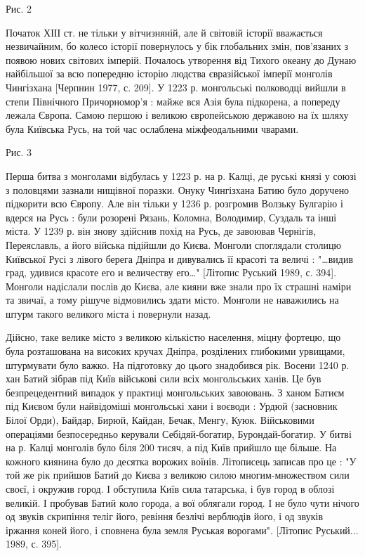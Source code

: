Рис. 2

Початок ХІІІ ст. не тільки у вітчизняній, але й світовій історії вважається
незвичайним, бо колесо історії повернулось у бік глобальних змін, пов'язаних з
появою нових світових імперій. Почалось утворення від Тихого океану до Дунаю
найбільшої за всю попередню історію людства євразійської імперії монголів
Чингізхана [Черпнин 1977, с. 209]. У 1223 р. монгольські полководці вийшли в
степи Північного Причорномор'я : майже вся Азія була підкорена, а попереду
лежала Європа. Самою першою і великою європейською державою на їх шляху була
Київська Русь, на той час ослаблена міжфеодальними чварами.

 Рис. 3

Перша битва з монголами відбулась у 1223 р. на р. Калці, де руські князі у
союзі з половцями зазнали нищівної поразки. Онуку Чингізхана Батию було
доручено підкорити всю Європу. Але він тільки у 1236 р. розгромив Волзьку
Булгарію і вдерся на Русь : були розорені Рязань, Коломна, Володимир, Суздаль
та інші міста. У 1239 р. він знову здійснив похід на Русь, де завоював
Чернігів, Переяславль, а його війська підійшли до Києва. Монголи споглядали
столицю Київської Русі з лівого берега Дніпра и дивувались її красоті та величі
: "…видив град, удивися красоте его и величеству его…" [Літопис Руський 1989,
с. 394]. Монголи надіслали послів до Києва, але кияни вже знали про їх страшні
наміри та звичаї, а тому рішуче відмовились здати місто. Монголи не наважились
на штурм такого великого міста і повернули назад.

Дійсно, таке велике місто з великою кількістю населення, міцну фортецю, що була
розташована на високих кручах Дніпра, розділених глибокими урвищами, штурмувати
було важко. На підготовку до цього знадобився рік. Восени 1240 р. хан Батий
зібрав під Київ військові сили всіх монгольських ханів. Це був безпрецедентний
випадок у практиці монгольських завоювань. З ханом Батиєм під Києвом були
найвідоміші монгольські хани і воєводи : Урдюй (засновник Білої Орди), Байдар,
Бирюй, Кайдан, Бечак, Менгу, Куюк. Військовими операціями безпосередньо
керували Себідяй-богатир, Бурондай-богатир. У битві на р. Калці монголів було
біля 200 тисяч, а під Київ прийшло ще більше. На кожного киянина було до
десятка ворожих воїнів. Літописець записав про це : "У той же рік прийшов Батий
до Києва з великою силою многим-множеством сили своєї, і окружив город. І
обступила Київ сила татарська, і був город в облозі великій. І пробував Батий
коло города, а вої облягали город. І не було чути нічого од звуків скрипіння
теліг його, ревіння безлічі верблюдів його, і од звуків іржання коней його, і
сповнена була земля Руськая ворогами". [Літопис Руський... 1989, с. 395].


